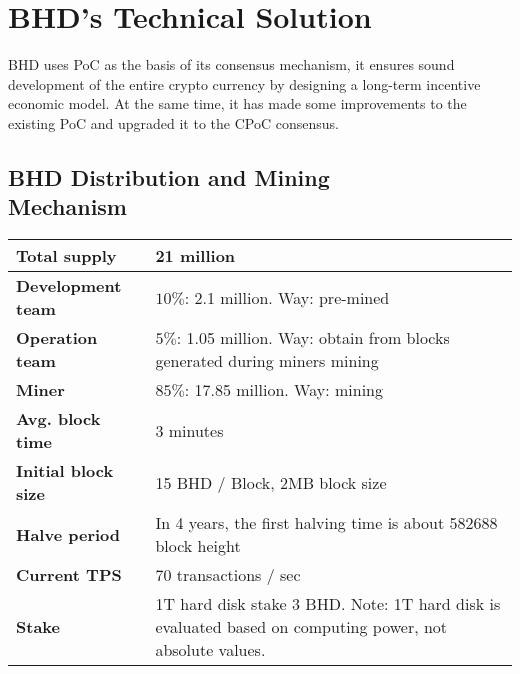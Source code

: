 \chapter{BHD's Technical Solution}
\begin{flushleft}
    BHD uses PoC as the basis of its consensus mechanism, it ensures sound development of the entire crypto currency by designing a long-term incentive economic model. At the same time, it has made some improvements to the existing PoC and upgraded it to the CPoC consensus.
\end{flushleft}
\section{BHD Distribution and Mining\\Mechanism}
\begin{tabular}{ |p{4cm}|p{8cm}| }
    \hline
    \textbf{Total supply}                           & 21 million                                                                                               \\[5pt]
    \hline
    \rowcolor{lightgray!20}\textbf{Development team}   & $10\%$: 2.1 million. Way: pre-mined                                                                      \\[5pt]
    \hline
    \textbf{Operation team}                         & $5\%$: 1.05 million. Way: obtain from blocks generated during miners mining                              \\[5pt]
    \hline
    \rowcolor{lightgray!20}\textbf{Miner}              & $85\%$: 17.85 million. Way: mining                                                                       \\[5pt]
    \hline
    \textbf{Avg. block time}                        & 3 minutes                                                                                                \\[5pt]
    \hline
    \rowcolor{lightgray!20}\textbf{Initial block size} & 15 BHD / Block, 2MB block size                                                                           \\[5pt]
    \hline
    \textbf{Halve period}                           & In 4 years, the first halving time is about 582688 block height                                          \\[5pt]
    \hline
    \rowcolor{lightgray!20}\textbf{Current TPS}        & 70 transactions / sec                                                                                    \\[5pt]
    \hline
    \textbf{Stake}                                  & 1T hard disk stake 3 BHD. Note: 1T hard disk is evaluated based on computing power, not absolute values. \\[5pt]
    \hline
\end{tabular}

